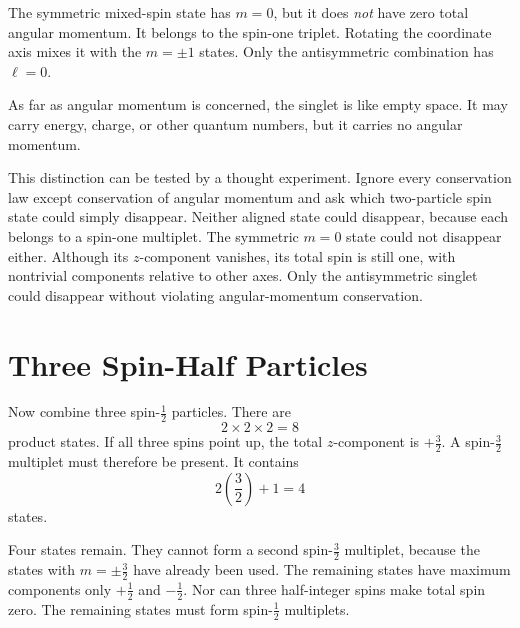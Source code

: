 The symmetric mixed-spin state has \(m=0\), but it does \emph{not} have zero total angular momentum. It belongs to the spin-one triplet. Rotating the coordinate axis mixes it with the \(m=\pm1\) states. Only the antisymmetric combination has \(\ell=0\).

As far as angular momentum is concerned, the singlet is like empty space. It may carry energy, charge, or other quantum numbers, but it carries no angular momentum.

This distinction can be tested by a thought experiment. Ignore every conservation law except conservation of angular momentum and ask which two-particle spin state could simply disappear. Neither aligned state could disappear, because each belongs to a spin-one multiplet. The symmetric \(m=0\) state could not disappear either. Although its \(z\)-component vanishes, its total spin is still one, with nontrivial components relative to other axes. Only the antisymmetric singlet could disappear without violating angular-momentum conservation.

\begin{classroomqa}
\end{classroomqa}

\section{Three Spin-Half Particles}

Now combine three spin-\(\tfrac12\) particles. There are
\begin{equation}
2\times2\times2=8
\end{equation}
product states. If all three spins point up, the total \(z\)-component is \(+\tfrac32\). A spin-\(\tfrac32\) multiplet must therefore be present. It contains
\begin{equation}
2\left(\frac32\right)+1=4
\end{equation}
states.

Four states remain. They cannot form a second spin-\(\tfrac32\) multiplet, because the states with \(m=\pm\tfrac32\) have already been used. The remaining states have maximum components only \(+\tfrac12\) and \(-\tfrac12\). Nor can three half-integer spins make total spin zero. The remaining states must form spin-\(\tfrac12\) multiplets.

